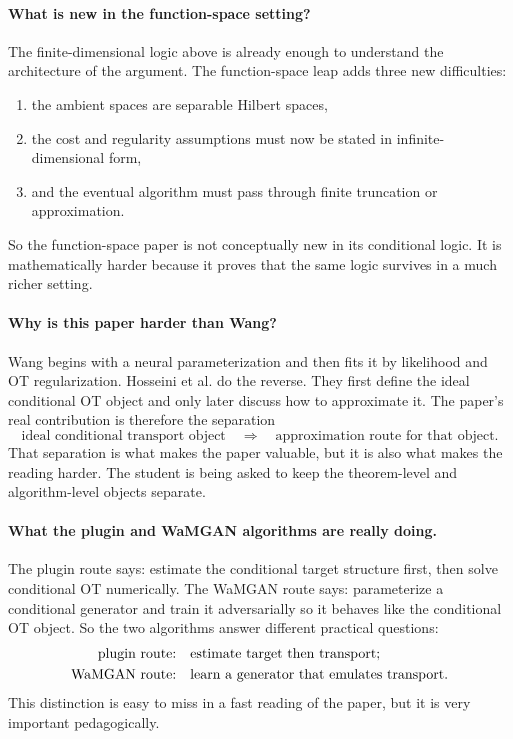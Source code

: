 \documentclass[11pt]{report}
\begin{document}
\paragraph{What is new in the function-space setting?}
The finite-dimensional logic above is already enough to understand the architecture
of the argument.  The function-space leap adds three new difficulties:
\begin{enumerate}[label=(\roman*)]
  \item the ambient spaces are separable Hilbert spaces,
  \item the cost and regularity assumptions must now be stated in infinite-dimensional form,
  \item and the eventual algorithm must pass through finite truncation or approximation.
\end{enumerate}
So the function-space paper is not conceptually new in its conditional logic.  It
is mathematically harder because it proves that the same logic survives in a much
richer setting.

\paragraph{Why is this paper harder than Wang?}
Wang begins with a neural parameterization and then fits it by likelihood and OT
regularization.  Hosseini et al. do the reverse.  They first define the ideal
conditional OT object and only later discuss how to approximate it.  The paper's
real contribution is therefore the separation
\begin{equation}
\text{ideal conditional transport object}
\quad\Longrightarrow\quad
\text{approximation route for that object}.
\label{eq:hosseini-theory-to-approximation}
\end{equation}
That separation is what makes the paper valuable, but it is also what makes the
reading harder.  The student is being asked to keep the theorem-level and
algorithm-level objects separate.

\paragraph{What the plugin and WaMGAN algorithms are really doing.}
The plugin route says: estimate the conditional target structure first, then solve
conditional OT numerically.  The WaMGAN route says: parameterize a conditional
generator and train it adversarially so it behaves like the conditional OT object.
So the two algorithms answer different practical questions:
\begin{align}
\text{plugin route:}
&\quad
\text{estimate target then transport};
\notag\\
\text{WaMGAN route:}
&\quad
\text{learn a generator that emulates transport}.
\label{eq:hosseini-two-algorithms}
\end{align}
This distinction is easy to miss in a fast reading of the paper, but it is very
important pedagogically.
\end{document}
